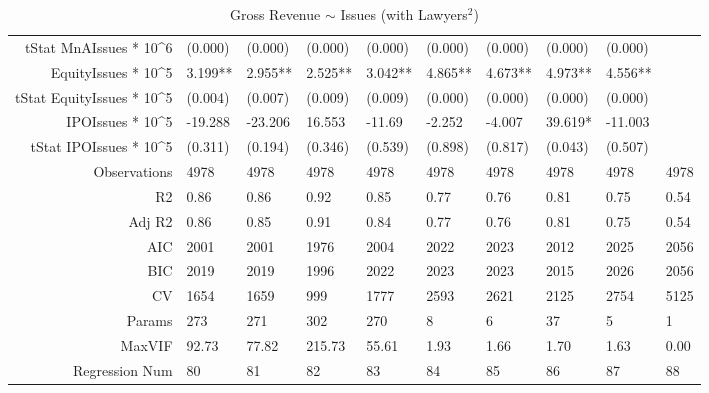 \begin{table}[ht]
\begin{tabular}{rlllllllll}
  tStat MnAIssues * 10^6 & (0.000) & (0.000) & (0.000) & (0.000) & (0.000) & (0.000) & (0.000) & (0.000) &  \\ 
  EquityIssues * 10^5 & 3.199** & 2.955** & 2.525** & 3.042** & 4.865** & 4.673** & 4.973** & 4.556** &  \\ 
  tStat EquityIssues * 10^5 & (0.004) & (0.007) & (0.009) & (0.009) & (0.000) & (0.000) & (0.000) & (0.000) &  \\ 
  IPOIssues * 10^5 & -19.288 & -23.206 & 16.553 & -11.69 & -2.252 & -4.007 & 39.619* & -11.003 &  \\ 
  tStat IPOIssues * 10^5 & (0.311) & (0.194) & (0.346) & (0.539) & (0.898) & (0.817) & (0.043) & (0.507) &  \\ 
  Observations & 4978 & 4978 & 4978 & 4978 & 4978 & 4978 & 4978 & 4978 & 4978 \\ 
  R2 & 0.86 & 0.86 & 0.92 & 0.85 & 0.77 & 0.76 & 0.81 & 0.75 & 0.54 \\ 
  Adj R2 & 0.86 & 0.85 & 0.91 & 0.84 & 0.77 & 0.76 & 0.81 & 0.75 & 0.54 \\ 
  AIC & 2001 & 2001 & 1976 & 2004 & 2022 & 2023 & 2012 & 2025 & 2056 \\ 
  BIC & 2019 & 2019 & 1996 & 2022 & 2023 & 2023 & 2015 & 2026 & 2056 \\ 
  CV & 1654 & 1659 & 999 & 1777 & 2593 & 2621 & 2125 & 2754 & 5125 \\ 
  Params & 273 & 271 & 302 & 270 & 8 & 6 & 37 & 5 & 1 \\ 
  MaxVIF & 92.73 & 77.82 & 215.73 & 55.61 & 1.93 & 1.66 & 1.70 & 1.63 & 0.00 \\ 
  Regression Num & 80 & 81 & 82 & 83 & 84 & 85 & 86 & 87 & 88 \\ 
   \hline
\end{tabular}
\caption{Gross Revenue $\sim$ Issues (with Lawyers$^2$)} 
\end{table}
